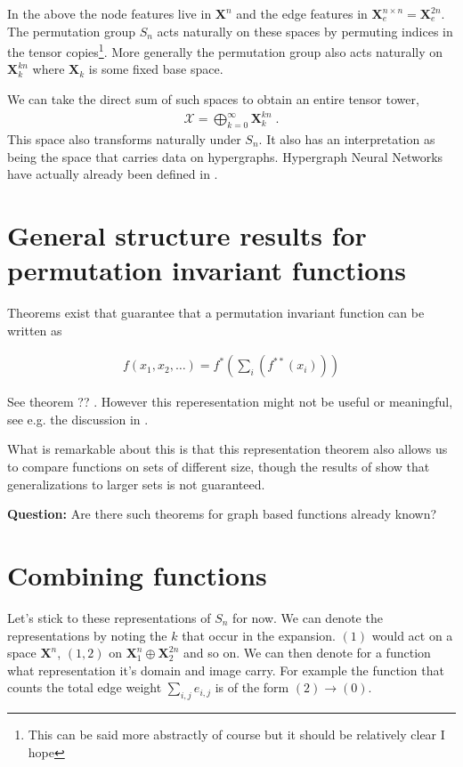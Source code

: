 \documentclass[reprint,twocolumn,amsmath,amssymb,aps]{revtex4-1}
\newcommand{\XX}{\mathcal{X}}
\newcommand{\X}{\mathbf{X}}
\begin{document}
In the above the node features live in $\X^n$ and the edge features in $\X_e^{n \times n} = \X_e^{2n}$. The permutation group $S_n$ acts naturally on these spaces by permuting indices in the tensor copies\footnote{This can be said more abstractly of course but it should be relatively clear I hope}. More generally the permutation group also acts naturally on $\X_k^{kn}$ where $\X_k$ is some fixed base space.

We can take the direct sum of such spaces to obtain an entire tensor tower,
\begin{align}
\XX = \bigoplus_{k=0}^{\infty} \X_k^{kn} \;.
\end{align}
This space also transforms naturally under $S_n$. It also has an interpretation as being the space that carries data on hypergraphs. Hypergraph Neural Networks have actually already been defined in \cite{feng2019hypergraph}.


\section{General structure results for permutation invariant functions}

Theorems exist that guarantee that a permutation invariant function can be written as

\begin{align}
f(x_1, x_2, \dots) = f^* \left(\sum_i (f^{**}(x_i))\right)
\end{align}

See theorem ?? \citet{zaheer2017deep}. However this reperesentation might not be useful or meaningful, see e.g. the discussion in \citet{wagstaff2019limitations}.

What is remarkable about this is that this representation theorem also allows us to compare functions on sets of different size, though the results of \citet{wagstaff2019limitations} show that generalizations to larger sets is not guaranteed.

\textbf{Question: } Are there such theorems for graph based functions already known?

\section{Combining functions}

Let's stick to these representations of $S_n$ for now. We can denote the representations by noting the $k$ that occur in the expansion. $(1)$ would act on a space $\X^n$, $(1,2)$ on $\X_1^n \oplus \X_2^{2n}$ and so on. We can then denote for a function what representation it's domain and image carry. For example the function that counts the total edge weight $\sum_{i,j} e_{i,j}$ is of the form $(2) \rightarrow (0)$.
\end{document}
